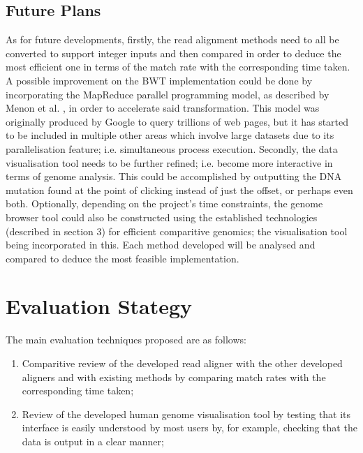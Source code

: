 \documentclass{csfyp}
\begin{document}
{{\subsection{Future Plans}\vspace{-2ex}
As for future developments, firstly, the read alignment methods need to all be converted to support integer inputs and then compared in order to deduce the most efficient one in terms of the match rate with the corresponding time taken.  A possible improvement on the BWT implementation could be done by incorporating the MapReduce parallel programming model, as described by Menon et al. \cite{mapreduce}, in order to accelerate said transformation.  This model was originally produced by Google to query trillions of web pages, but it has started to be included in multiple other areas which involve large datasets due to its parallelisation feature; i.e. simultaneous process execution.     
Secondly, the data visualisation tool needs to be further refined; i.e. become more interactive in terms of genome analysis.  This could be accomplished by outputting the DNA mutation found at the point of clicking instead of just the offset, or perhaps even both.       
Optionally, depending on the project's time constraints, the genome browser tool could also be constructed using the established technologies (described in section 3) for efficient comparitive genomics; the visualisation tool being incorporated in this.  Each method developed will be analysed and compared to deduce the most feasible implementation.   


\section{Evaluation Stategy}\vspace{-2ex}

The main evaluation techniques proposed are as follows:

\begin{enumerate}[nolistsep]

  \item	Comparitive review of the developed read aligner with the other developed aligners and with existing methods by comparing match rates with the corresponding time taken;

  \item Review of the developed human genome visualisation tool by testing that its interface is easily understood by most users by, for example, checking that the data is output in a clear manner;


\end{enumerate}}}
\end{document}
